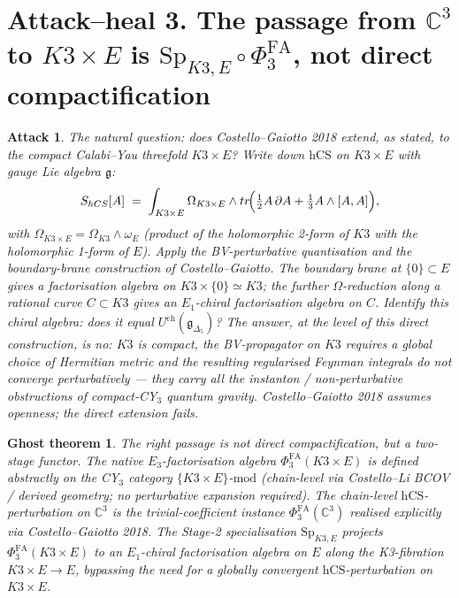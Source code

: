 \documentclass[11pt]{article}
\newtheorem*{ghost}{Ghost theorem}
\newtheorem*{attack}{Attack}
\providecommand{\Eone}{E_1}
\providecommand{\Ethree}{E_3}
\providecommand{\C}{\mathbb{C}}
\providecommand{\cA}{\mathcal{A}}
\providecommand{\fg}{\mathfrak{g}}
\providecommand{\hCS}{\mathrm{hCS}}
\providecommand{\Sp}{\mathrm{Sp}}
\providecommand{\dbar}{\bar\partial}
\begin{document}
\section{Attack--heal 3. The passage from $\C^3$ to $K3\times E$ is
  $\Sp_{K3,E}\circ\Phi^{\mathrm{FA}}_3$, not direct compactification}
\label{sec:cycle3}

\begin{attack}
The natural question: does Costello--Gaiotto 2018 extend, as stated, to
the compact Calabi--Yau threefold $K3 \times E$? Write down $\hCS$ on
$K3\times E$ with gauge Lie algebra $\fg$:
\[
  S_{\hCS}[\cA]
  \;=\; \int_{K3\times E} \Omega_{K3\times E} \wedge \mathrm{tr}\!\Bigl(
      \tfrac{1}{2}\cA\,\dbar\cA
      + \tfrac{1}{3}\cA \wedge [\cA,\cA]\Bigr),
\]
with $\Omega_{K3\times E} = \Omega_{K3}\wedge\omega_E$ (product of the
holomorphic 2-form of $K3$ with the holomorphic 1-form of $E$). Apply
the BV-perturbative quantisation and the boundary-brane construction
of Costello--Gaiotto. The boundary brane at $\{0\}\subset E$ gives a
factorisation algebra on $K3\times\{0\} \simeq K3$; the further
$\Omega$-reduction along a rational curve $C\subset K3$ gives an
$\Eone$-chiral factorisation algebra on $C$. Identify this chiral
algebra: \emph{does it equal $U^{\mathrm{ch}}(\fg_{\Delta_5})$?}
The answer, at the level of this direct construction, is \emph{no}:
$K3$ is compact, the BV-propagator on $K3$ requires a global choice
of Hermitian metric and the resulting regularised Feynman integrals
do not converge perturbatively --- they carry all the instanton /
non-perturbative obstructions of compact-CY$_3$ quantum gravity.
Costello--Gaiotto 2018 assumes openness; the direct extension fails.
\end{attack}

\begin{ghost}
\emph{The right passage is not direct compactification, but a two-stage
functor. The native $\Ethree$-factorisation algebra
$\Phi^{\mathrm{FA}}_3(K3\times E)$ is defined abstractly on the CY$_3$
category $\{K3\times E\}$-$\mathrm{mod}$ (chain-level via Costello--Li
BCOV / derived geometry; no perturbative expansion required). The
chain-level $\hCS$-perturbation on $\C^3$ is the trivial-coefficient
instance $\Phi^{\mathrm{FA}}_3(\C^3)$ realised explicitly via
Costello--Gaiotto 2018. The Stage-2 specialisation $\Sp_{K3,E}$ projects
$\Phi^{\mathrm{FA}}_3(K3\times E)$ to an $\Eone$-chiral factorisation
algebra on $E$ along the K3-fibration $K3\times E \to E$, bypassing the
need for a globally convergent $\hCS$-perturbation on $K3\times E$.}
\end{ghost}
\end{document}

